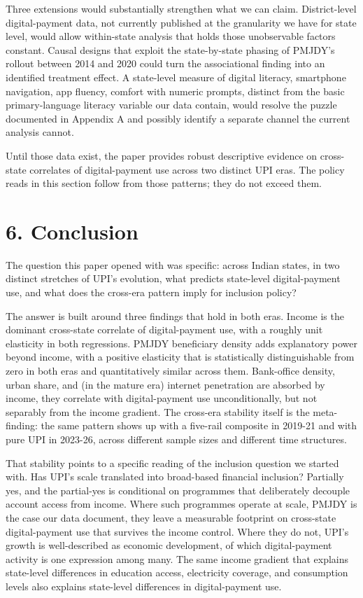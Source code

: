 \documentclass[
]{article}
\begin{document}
Three extensions would substantially strengthen what we can claim.
District-level digital-payment data, not currently published at the
granularity we have for state level, would allow within-state analysis
that holds those unobservable factors constant. Causal designs that
exploit the state-by-state phasing of PMJDY's rollout between 2014 and
2020 could turn the associational finding into an identified treatment
effect. A state-level measure of digital literacy, smartphone
navigation, app fluency, comfort with numeric prompts, distinct from the
basic primary-language literacy variable our data contain, would resolve
the puzzle documented in Appendix A and possibly identify a separate
channel the current analysis cannot.

Until those data exist, the paper provides robust descriptive evidence
on cross-state correlates of digital-payment use across two distinct UPI
eras. The policy reads in this section follow from those patterns; they
do not exceed them.

\section{6. Conclusion}\label{conclusion}

The question this paper opened with was specific: across Indian states,
in two distinct stretches of UPI's evolution, what predicts state-level
digital-payment use, and what does the cross-era pattern imply for
inclusion policy?

The answer is built around three findings that hold in both eras. Income
is the dominant cross-state correlate of digital-payment use, with a
roughly unit elasticity in both regressions. PMJDY beneficiary density
adds explanatory power beyond income, with a positive elasticity that is
statistically distinguishable from zero in both eras and quantitatively
similar across them. Bank-office density, urban share, and (in the
mature era) internet penetration are absorbed by income, they correlate
with digital-payment use unconditionally, but not separably from the
income gradient. The cross-era stability itself is the meta-finding: the
same pattern shows up with a five-rail composite in 2019-21 and with
pure UPI in 2023-26, across different sample sizes and different time
structures.

That stability points to a specific reading of the inclusion question we
started with. Has UPI's scale translated into broad-based financial
inclusion? Partially yes, and the partial-yes is conditional on
programmes that deliberately decouple account access from income. Where
such programmes operate at scale, PMJDY is the case our data document,
they leave a measurable footprint on cross-state digital-payment use
that survives the income control. Where they do not, UPI's growth is
well-described as economic development, of which digital-payment
activity is one expression among many. The same income gradient that
explains state-level differences in education access, electricity
coverage, and consumption levels also explains state-level differences
in digital-payment use.
\end{document}
